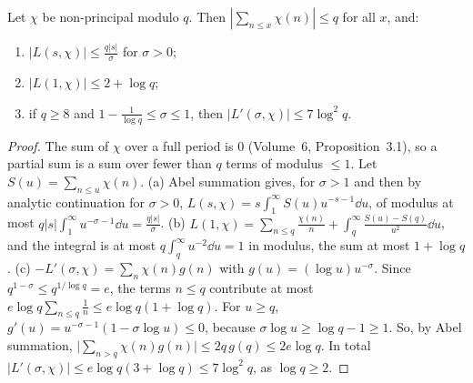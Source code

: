 \begin{lemma}[size of $L$]\label{lem:lsize}
Let $\chi$ be non-principal modulo $q$. Then $|\sum_{n\le x}\chi(n)|\le q$ for all $x$, and:
\begin{enumerate}[label=(\alph*)]
\item $|L(s,\chi)|\le\frac{q|s|}\sigma$ for $\sigma>0$;
\item $|L(1,\chi)|\le2+\log q$;
\item if $q\ge8$ and $1-\frac1{\log q}\le\sigma\le1$, then $|L'(\sigma,\chi)|\le7\log^2q$.
\end{enumerate}
\end{lemma}
\begin{proof}
The sum of $\chi$ over a full period is $0$ (Volume~6, Proposition~3.1), so a partial sum is a sum over fewer than $q$ terms of modulus $\le1$. Let $S(u)=\sum_{n\le u}\chi(n)$.
(a) Abel summation gives, for $\sigma>1$ and then by analytic continuation for $\sigma>0$, $L(s,\chi)=s\int_1^\infty S(u)u^{-s-1}\dd u$, of modulus at most $q|s|\int_1^\infty u^{-\sigma-1}\dd u=\frac{q|s|}\sigma$.
(b) $L(1,\chi)=\sum_{n\le q}\frac{\chi(n)}n+\int_q^\infty\frac{S(u)-S(q)}{u^2}\dd u$, and the integral is at most $q\int_q^\infty u^{-2}\dd u=1$ in modulus, the sum at most $1+\log q$.
(c) $-L'(\sigma,\chi)=\sum_n\chi(n)g(n)$ with $g(u)=(\log u)u^{-\sigma}$. Since $q^{1-\sigma}\le q^{1/\log q}=e$, the terms $n\le q$ contribute at most $e\log q\sum_{n\le q}\frac1n\le e\log q(1+\log q)$. For $u\ge q$,
$g'(u)=u^{-\sigma-1}(1-\sigma\log u)\le0$, because $\sigma\log u\ge\log q-1\ge1$. So, by Abel summation, $\bigl|\sum_{n>q}\chi(n)g(n)\bigr|\le2q\,g(q)\le2e\log q$. In total $|L'(\sigma,\chi)|\le e\log q(3+\log q)\le7\log^2q$, as $\log q\ge2$.
\end{proof}

